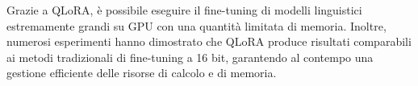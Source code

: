 Grazie a QLoRA, è possibile eseguire il fine-tuning di modelli linguistici estremamente grandi su GPU con una quantità limitata di memoria. Inoltre, numerosi esperimenti hanno dimostrato che QLoRA produce risultati comparabili ai metodi tradizionali di fine-tuning a 16 bit, garantendo al contempo una gestione efficiente delle risorse di calcolo e di memoria.





